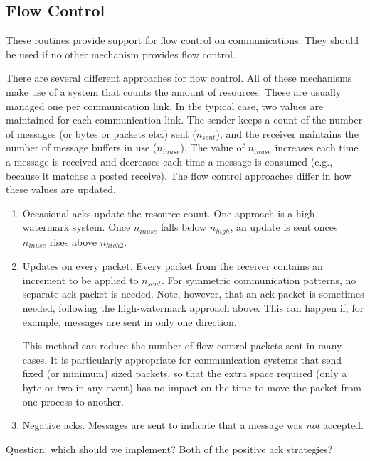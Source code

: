 \documentclass{article}
\begin{document}
\subsection{Flow Control}
\label{sec:flow-control}
These routines provide support for flow control on communications.
They should be used if no other mechanism provides flow control.

\makeussubscript
There are several different approaches for flow control.  All of these
mechanisms make use of a system that counts the amount of resources.
These are usually managed one per communication link.  In the typical
case, two values are maintained for each communication link.  The
sender keeps a count of the number of messages (or bytes or packets
etc.) sent ($n_{sent}$), and the receiver maintains the number of
message buffers 
in use ($n_{inuse}$).  The value of $n_{inuse}$ increases each time a
message is received and decreases each time a message is consumed
(e.g., because it matches a posted receive). 
The flow control approaches differ in how these values are updated. 

\begin{enumerate}
\item Occasional acks update the resource count.  One approach is a
high-watermark system.  Once $n_{inuse}$ falls below $n_{high}$, an
update is sent onces $n_{inuse}$ rises above $n_{high2}$. 

\item Updates on every packet.  Every packet from the receiver
contains an increment to be applied to $n_{sent}$.  For symmetric
communication patterns, no separate ack packet is needed.  Note,
however, that an ack packet is sometimes needed, following the
high-watermark approach above.  This can happen if, for example,
messages are sent in only one direction.  

This method can reduce the number of flow-control packets sent in many
cases.  It is particularly appropriate for communication systems that
send fixed (or minimum) sized packets, so that the extra space
required (only a byte or two in any event) has no impact on the time
to move the packet from one process to another.  

\item Negative acks.  Messages are sent to indicate that a message was
\emph{not} accepted. 

\end{enumerate}
\makeustext

Question: which should we implement?  Both of the positive ack
strategies? 
\end{document}

